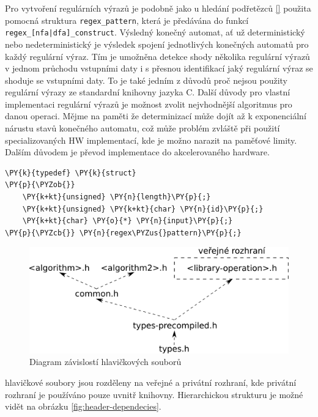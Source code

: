 Pro vytvoření regulárních výrazů je podobně jako u hledání podřetězců \ref{}
použita pomocná struktura \texttt{regex\_pattern}, která je předávána do funkcí \texttt{regex\_[nfa|dfa]\_construct}.
Výsledný konečný automat, ať už deterministický nebo nedeterministický je výsledek spojení jednotlivých
konečných automatů pro každý regulární výraz. Tím je umožněna detekce shody několika
regulární výrazů v jednom průchodu vstupními daty i s přesnou identifikací jaký regulární
výraz se shoduje se vstupními daty. To je také jedním z důvodů proč nejsou použity regulární výrazy ze standardní
knihovny jazyka C.
Další důvody pro vlastní implementaci regulární výrazů je možnost zvolit nejvhodnější algoritmus pro danou operaci.
Mějme na paměti že determinizací může dojít až k exponenciální nárustu stavů konečného automatu, což může problém
zvláště při použití specializovaných HW implementací, kde je možno narazit na paměťové limity.
Dalším důvodem je převod implementace do akcelerovaného hardware.

\begin{Verbatim}[commandchars=\\\{\}]
\PY{k}{typedef} \PY{k}{struct}
\PY{p}{\PYZob{}}
	\PY{k+kt}{unsigned} \PY{n}{length}\PY{p}{;}
	\PY{k+kt}{unsigned} \PY{k+kt}{char} \PY{n}{id}\PY{p}{;}
	\PY{k+kt}{char} \PY{o}{*} \PY{n}{input}\PY{p}{;}
\PY{p}{\PYZcb{}} \PY{n}{regex\PYZus{}pattern}\PY{p}{;}
\end{Verbatim}

\begin{figure}[!htbp]
	\centering
	\includegraphics[scale=.25]{fig/header-dependencies.pdf}
	\caption{Diagram závislostí hlavičkových souborů}
\end{figure}\label{fig:header-dependecies}

hlavičkové soubory jsou rozděleny na veřejné a privátní rozhraní, kde privátní rozhraní je používáno pouze uvnitř knihovny. Hierarchickou strukturu je možné vidět na obrázku \ref{fig:header-dependecies}.

